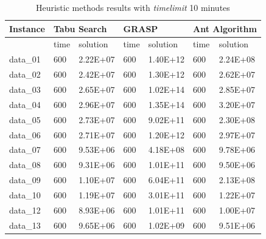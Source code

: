 \begin{table}[]
\caption{Heuristic methods results with \textit{timelimit} 10 minutes}
\begin{tabular}{lllllll}
\hline
Instance & \multicolumn{2}{l}{\textbf{Tabu Search}} & \multicolumn{2}{l}{\textbf{GRASP}} & \multicolumn{2}{l}{\textbf{Ant Algorithm}} \\ \hline
         & time              & solution             & time           & solution          & time               & solution              \\ \hline
data\_01 & 600               & 2.22E+07             & 600            & 1.40E+12          & 600                & 2.24E+08              \\
data\_02 & 600               & 2.42E+07             & 600            & 1.30E+12          & 600                & 2.62E+07              \\
data\_03 & 600               & 2.65E+07             & 600            & 1.02E+14          & 600                & 2.85E+07              \\
data\_04 & 600               & 2.96E+07             & 600            & 1.35E+14          & 600                & 3.20E+07              \\
data\_05 & 600               & 2.73E+07             & 600            & 9.02E+11          & 600                & 2.30E+08              \\
data\_06 & 600               & 2.71E+07             & 600            & 1.20E+12          & 600                & 2.97E+07              \\
data\_07 & 600               & 9.53E+06             & 600            & 4.18E+08          & 600                & 9.78E+06              \\
data\_08 & 600               & 9.31E+06             & 600            & 1.01E+11          & 600                & 9.50E+06              \\
data\_09 & 600               & 1.10E+07             & 600            & 6.04E+11          & 600                & 2.13E+08              \\
data\_10 & 600               & 1.19E+07             & 600            & 3.01E+11          & 600                & 1.22E+07              \\
data\_12 & 600               & 8.93E+06             & 600            & 1.01E+11          & 600                & 1.00E+07              \\
data\_13 & 600               & 9.65E+06             & 600            & 1.02E+09          & 600                & 9.51E+06              \\

\end{tabular}
\end{table}
